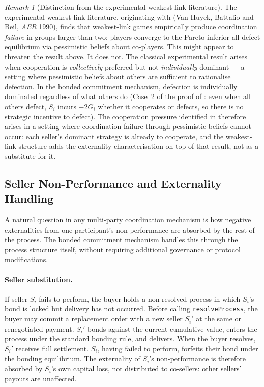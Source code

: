 \documentclass[11pt,a4paper]{article}
\theoremstyle{definition}
\theoremstyle{remark}
\newtheorem{remark}[theorem]{Remark}
\newcommand{\cumval}{G}        %
\begin{document}
\begin{remark}[Distinction from the experimental weakest-link literature]
\label{rem:vanhuyck}
The experimental weakest-link literature, originating with
\citet{vanhuyck1990} (Van Huyck, Battalio and Beil, \emph{AER} 1990),
finds that weakest-link games empirically produce coordination
\emph{failure} in groups larger than two: players converge to the
Pareto-inferior all-defect equilibrium via pessimistic beliefs about
co-players. This might appear to threaten the result above. It does
not. The classical experimental result arises when cooperation is
\emph{collectively} preferred but not \emph{individually} dominant ---
a setting where pessimistic beliefs about others are sufficient to
rationalise defection. In the bonded commitment mechanism, defection
is individually dominated regardless of what others do (Case~2 of the
proof of : even when all others defect, $S_i$
incurs $-2\cumval_i$ whether it cooperates or defects, so there is no
strategic incentive to defect). The cooperation pressure identified in
 therefore arises in a setting where
coordination failure through pessimistic beliefs cannot occur: each
seller's dominant strategy is already to cooperate, and the weakest-link
structure adds the externality characterisation on top of that result,
not as a substitute for it.
\end{remark}

\subsection{Seller Non-Performance and Externality Handling}
\label{sec:externalities}

A natural question in any multi-party coordination mechanism is how
negative externalities from one participant's non-performance are
absorbed by the rest of the process. The bonded commitment mechanism
handles this through the process structure itself, without requiring
additional governance or protocol modifications.

\paragraph{Seller substitution.}
If seller $S_i$ fails to perform, the buyer holds a non-resolved
process in which $S_i$'s bond is locked but delivery has not
occurred. Before calling \texttt{resolveProcess}, the buyer may
commit a replacement order with a new seller $S_i'$ at the same or
renegotiated payment. $S_i'$ bonds against the current cumulative
value, enters the process under the standard bonding rule, and
delivers. When the buyer resolves, $S_i'$ receives full settlement.
$S_i$, having failed to perform, forfeits their bond under the
bonding equilibrium. The externality of $S_i$'s non-performance is
therefore absorbed by $S_i$'s own capital loss, not distributed to
co-sellers: other sellers' payouts are unaffected.
\end{document}
